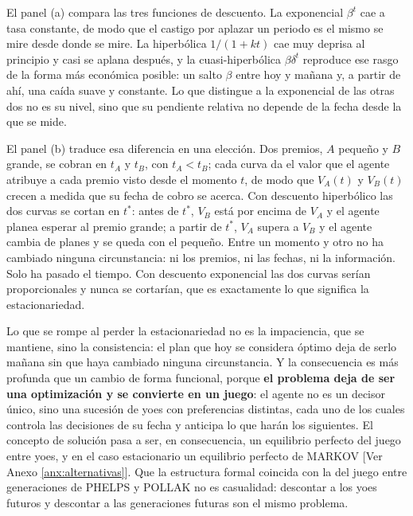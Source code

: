 \documentclass[10pt,a4paper]{article}
\newcommand{\authorfont}[1]{{\fontfamily{EBGaramond-TLF}\selectfont #1}}
\begin{document}
El panel (a) compara las tres funciones de descuento. La exponencial $\beta^t$ cae a tasa constante, de modo que el castigo por aplazar un periodo es el mismo se mire desde donde se mire. La hiperbólica $1/(1+kt)$ cae muy deprisa al principio y casi se aplana después, y la cuasi-hiperbólica $\beta\delta^t$ reproduce ese rasgo de la forma más económica posible: un salto $\beta$ entre hoy y mañana y, a partir de ahí, una caída suave y constante. Lo que distingue a la exponencial de las otras dos no es su nivel, sino que su pendiente relativa no depende de la fecha desde la que se mide.

El panel (b) traduce esa diferencia en una elección. Dos premios, $A$ pequeño y $B$ grande, se cobran en $t_A$ y $t_B$, con $t_A<t_B$; cada curva da el valor que el agente atribuye a cada premio visto desde el momento $t$, de modo que $V_A(t)$ y $V_B(t)$ crecen a medida que su fecha de cobro se acerca. Con descuento hiperbólico las dos curvas se cortan en $t^{*}$: antes de $t^{*}$, $V_B$ está por encima de $V_A$ y el agente planea esperar al premio grande; a partir de $t^{*}$, $V_A$ supera a $V_B$ y el agente cambia de planes y se queda con el pequeño. Entre un momento y otro no ha cambiado ninguna circunstancia: ni los premios, ni las fechas, ni la información. Solo ha pasado el tiempo. Con descuento exponencial las dos curvas serían proporcionales y nunca se cortarían, que es exactamente lo que significa la estacionariedad.

Lo que se rompe al perder la estacionariedad no es la impaciencia, que se mantiene, sino la consistencia: el plan que hoy se considera óptimo deja de serlo mañana sin que haya cambiado ninguna circunstancia. Y la consecuencia es más profunda que un cambio de forma funcional, porque \textbf{el problema deja de ser una optimización y se convierte en un juego}: el agente no es un decisor único, sino una sucesión de yoes con preferencias distintas, cada uno de los cuales controla las decisiones de su fecha y anticipa lo que harán los siguientes. El concepto de solución pasa a ser, en consecuencia, un equilibrio perfecto del juego entre yoes, y en el caso estacionario un equilibrio perfecto de MARKOV [\authorfont{Ver Anexo \ref{anx:alternativas}}]. Que la estructura formal coincida con la del juego entre generaciones de PHELPS y POLLAK no es casualidad: descontar a los yoes futuros y descontar a las generaciones futuras son el mismo problema.
\end{document}
